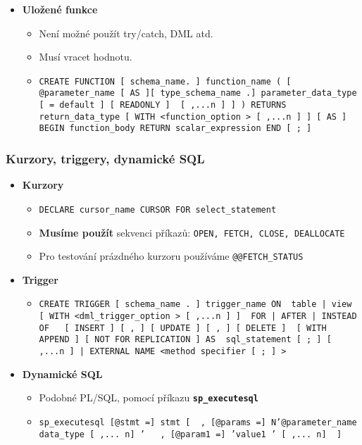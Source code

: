 \begin{itemize}
\item \textbf{Uložené funkce}
\begin{itemize}
\item Není možné použít try/catch, DML atd.
\item Musí vracet hodnotu.
\item \texttt{CREATE FUNCTION [ schema\_name. ] function\_name ( [ { @parameter\_name [ AS ][ type\_schema\_name .] parameter\_data\_type [ = default ] [ READONLY ] } [ ,...n ] ] ) RETURNS return\_data\_type [ WITH <function\_option > [ ,...n ] ] [ AS ] BEGIN function\_body RETURN scalar\_expression END [ ; ]}
\end{itemize}
\end{itemize}



\subsubsection{Kurzory, triggery, dynamické SQL}
\begin{itemize}
\item \textbf{Kurzory}
\begin{itemize}
\item \texttt{DECLARE cursor\_name CURSOR FOR select\_statement }
\item \textbf{Musíme použít} sekvenci příkazů: \texttt{OPEN, FETCH, CLOSE, DEALLOCATE }
\item Pro testování prázdného kurzoru používáme \texttt{@@FETCH\_STATUS}
\end{itemize}

\item \textbf{Trigger}
\begin{itemize}
\item \texttt{CREATE TRIGGER [ schema\_name . ] trigger\_name ON { table | view } [ WITH <dml\_trigger\_option > [ ,...n ] ] { FOR | AFTER | INSTEAD OF } { [ INSERT ] [ , ] [ UPDATE ] [ , ] [ DELETE ] } [ WITH APPEND ] [ NOT FOR REPLICATION ] AS { sql\_statement [ ; ] [ ,...n ] | EXTERNAL NAME <method specifier [ ; ] > }}
\end{itemize}

\item \textbf{Dynamické SQL}
\begin{itemize}
\item Podobné PL/SQL, pomocí příkazu \textbf{\texttt{sp\_executesql}}
\item \texttt{sp\_executesql [@stmt =] stmt [ { , [@params =] N’@parameter\_name data\_type [ ,... n] ’ } { , [@param1 =] ’value1 ’ [ ,... n] } ]}
\end{itemize}
\end{itemize}



